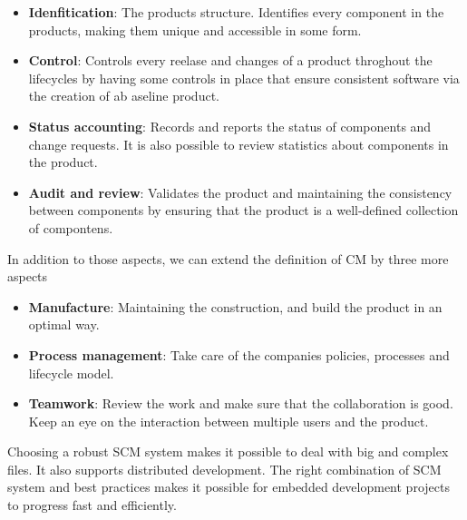 \begin{itemize}
	\item \textbf{Idenfitication}: The products structure. Identifies every component in the products, making them unique and accessible in some form.
	\item \textbf{Control}: Controls every reelase and changes of a product throghout the lifecycles by having some controls in place that ensure consistent software via the creation of ab aseline product.
	\item \textbf{Status accounting}: Records and reports the status of components and change requests. It is also possible to review statistics about components in the product.
	\item \textbf{Audit and review}: Validates the product and maintaining the consistency between components by ensuring that the product is a well-defined collection of compontens.
\end{itemize}

In addition to those aspects, we can extend the definition of CM by three more aspects
\begin{itemize}
	\item \textbf{Manufacture}: Maintaining the construction, and build the product in an optimal way.
	\item \textbf{Process management}: Take care of the companies policies, processes and lifecycle model.
	\item \textbf{Teamwork}: Review the work and make sure that the collaboration is good. Keep an eye on the interaction between multiple users and the product.

\end{itemize}

Choosing a robust SCM system makes it possible to deal with big and complex files. It also supports distributed development. The right combination of SCM system and best practices makes it possible for embedded development projects to progress fast and efficiently. 

